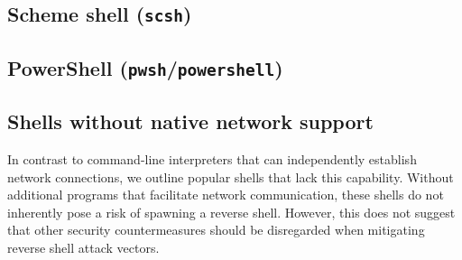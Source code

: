 



\subsection{Scheme shell (\texttt{scsh})}



\subsection{PowerShell (\texttt{pwsh}/\texttt{powershell})}





\subsection{Shells without native network support}

In contrast to command-line interpreters that can independently establish network connections, we outline popular shells that lack this capability. Without additional programs that facilitate network communication, these shells do not inherently pose a risk of spawning a reverse shell. However, this does not suggest that other security countermeasures should be disregarded when mitigating reverse shell attack vectors.

